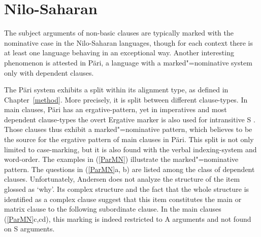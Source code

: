 \section{Nilo-Saharan}\label{NonBasicNilo}

The subject arguments of non-basic clauses are typically marked with the nominative  case in the Nilo-Saharan languages, though for each context there is at least one language behaving in an exceptional way.
Another interesting phenomenon is attested in P\"ari, a language with a marked"=nominative system only with dependent clauses. 

The P\"ari system exhibits a split within its alignment type, as defined in Chapter~\ref{method}. 
More precisely, it is split between different clause-types. 
In main clauses, P\"ari has an ergative-pattern, yet in imperatives and most dependent clause-types the overt Ergative marker is also used for intransitive S \citep[316--319]{Andersen:1988}. 
Those clauses thus exhibit a marked"=nominative pattern, which \citet[316]{Andersen:1988} believes to be the source for the ergative pattern of main clauses in P\"ari.
This split is not only limited to case-marking, but it is also found with the verbal indexing-system and word-order.
The examples in (\ref{ParMN}) illustrate the marked"=nominative pattern. 
The questions in (\ref{ParMN}a, b) are listed among the class of dependent clauses. 
Unfortunately, Andersen does not analyze the structure of the item glossed as `why'. 
Its complex structure and the fact that the whole structure is identified as a complex clause suggest that this item constitutes the main or matrix clause to the following subordinate clause. 
In the main clauses (\ref{ParMN}c,cd), this marking is indeed restricted to A arguments and not found on S arguments.

